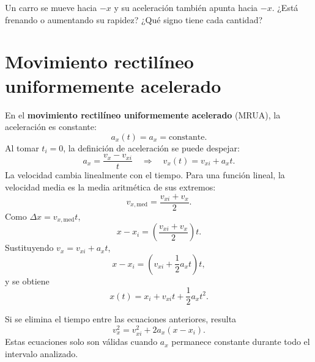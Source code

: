 \documentclass[11pt]{article}
\begin{document}
\begin{pregunta}
Un carro se mueve hacia \(-x\) y su aceleración también apunta hacia \(-x\).
¿Está frenando o aumentando su rapidez? ¿Qué signo tiene cada cantidad?
\end{pregunta}

\section{Movimiento rectilíneo uniformemente acelerado}

En el \textbf{movimiento rectilíneo uniformemente acelerado} (MRUA), la
aceleración es constante:
\[
  a_x(t)=a_x=\text{constante}.
\]
Al tomar \(t_i=0\), la definición de aceleración se puede despejar:
\[
  a_x
  =
  \frac{v_x-v_{xi}}{t}
  \quad\Longrightarrow\quad
  \boxed{v_x(t)=v_{xi}+a_xt}.
\]
La velocidad cambia linealmente con el tiempo. Para una función lineal, la
velocidad media es la media aritmética de sus extremos:
\[
  v_{x,\mathrm{med}}
  =
  \frac{v_{xi}+v_x}{2}.
\]
Como \(\Delta x=v_{x,\mathrm{med}}t\),
\[
  x-x_i
  =
  \left(\frac{v_{xi}+v_x}{2}\right)t.
\]
Sustituyendo \(v_x=v_{xi}+a_xt\),
\[
  x-x_i
  =
  \left(v_{xi}+\frac12a_xt\right)t,
\]
y se obtiene
\[
  \boxed{x(t)=x_i+v_{xi}t+\frac12a_xt^2}.
\]

Si se elimina el tiempo entre las ecuaciones anteriores, resulta
\[
  \boxed{v_x^2=v_{xi}^2+2a_x(x-x_i)}.
\]
Estas ecuaciones solo son válidas cuando \(a_x\) permanece constante durante
todo el intervalo analizado.

\begin{center}
\end{center}
\end{document}
